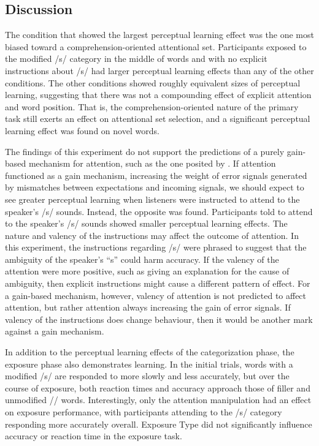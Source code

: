 \subsection{Discussion}

The condition that showed the largest perceptual learning effect was the one most biased toward a comprehension-oriented attentional set.
Participants exposed to the modified /s/ category in the middle of words and with no explicit instructions about /s/ had larger perceptual learning effects than any of the other conditions.
The other conditions showed roughly equivalent sizes of perceptual learning, suggesting that there was not a compounding effect of explicit attention and word position.
That is, the comprehension-oriented nature of the primary task still exerts an effect on attentional set selection, and a significant perceptual learning effect was found on novel words.

The findings of this experiment do not support the predictions of a purely gain-based mechanism for attention, such as the one posited by \citet{Clark2013}.
If attention functioned as a gain mechanism, increasing the weight of error signals generated by mismatches between expectations and incoming signals, we should expect to see greater perceptual learning when listeners were instructed to attend to the speaker's /s/ sounds.
Instead, the opposite was found.
Participants told to attend to the speaker's /s/ sounds showed smaller perceptual learning effects.
The nature and valency of the instructions may affect the outcome of attention.
In this experiment, the instructions regarding /s/ were phrased to suggest that the ambiguity of the speaker's ``s'' could harm accuracy.
If the valency of the attention were more positive, such as giving an explanation for the cause of ambiguity, then explicit instructions might cause a different pattern of effect.
For a gain-based mechanism, however, valency of attention is not predicted to affect attention, but rather attention always increasing the gain of error signals.
If valency of the instructions does change behaviour, then it would be another mark against a gain mechanism.

In addition to the perceptual learning effects of the categorization phase, the exposure phase also demonstrates learning.  
In the initial trials, words with a modified /s/ are responded to more slowly and less accurately, but over the course of exposure, both reaction times and accuracy approach those of filler and unmodified /\textesh/ words.
Interestingly, only the attention manipulation had an effect on exposure performance, with participants attending to the /s/ category responding more accurately overall.
Exposure Type did not significantly influence accuracy or reaction time in the exposure task.

